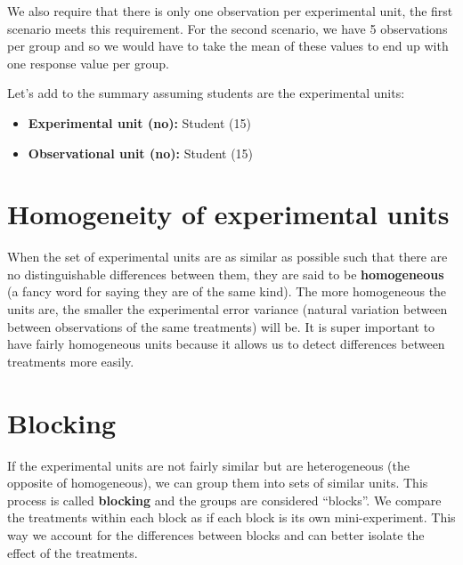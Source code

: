 \documentclass[
  letterpaper,
]{book}
\providecommand{\tightlist}{%
  \setlength{\itemsep}{0pt}\setlength{\parskip}{0pt}}\usepackage{longtable,booktabs,array}
\begin{document}
We also require that there is only one observation per experimental
unit, the first scenario meets this requirement. For the second
scenario, we have 5 observations per group and so we would have to take
the mean of these values to end up with one response value per group.

Let's add to the summary assuming students are the experimental units:

\begin{itemize}
\tightlist
\item
  \textbf{Experimental unit (no):} Student (15)\\
\item
  \textbf{Observational unit (no):} Student (15)
\end{itemize}

\section*{\texorpdfstring{\textbf{Homogeneity of experimental
units}}{Homogeneity of experimental units}}\label{homogeneity-of-experimental-units}


When the set of experimental units are as similar as possible such that
there are no distinguishable differences between them, they are said to
be \textbf{homogeneous} (a fancy word for saying they are of the same
kind). The more homogeneous the units are, the smaller the experimental
error variance (natural variation between between observations of the
same treatments) will be. It is super important to have fairly
homogeneous units because it allows us to detect differences between
treatments more easily.

\section*{\texorpdfstring{\textbf{Blocking}}{Blocking}}\label{blocking}


If the experimental units are not fairly similar but are heterogeneous
(the opposite of homogeneous), we can group them into sets of similar
units. This process is called \textbf{blocking} and the groups are
considered ``blocks''. We compare the treatments within each block as if
each block is its own mini-experiment. This way we account for the
differences between blocks and can better isolate the effect of the
treatments.
\end{document}
